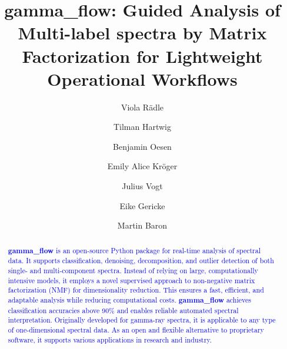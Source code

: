 \documentclass[preprint,12pt, a4paper]{elsarticle}
\begin{document}
\renewcommand{\labelenumii}{\arabic{enumi}.\arabic{enumii}}

\begin{frontmatter}



\title{gamma\_flow: \textbf{G}uided \textbf{A}nalysis of \textbf{M}ulti-label spectra by \textbf{Ma}trix \textbf{F}actorization for \textbf{L}ightweight \textbf{O}perational \textbf{W}orkflows}


\author[ki-lab]{Viola Rädle }
\author[ki-lab]{Tilman Hartwig}
\author[ki-lab]{Benjamin Oesen}
\author[bfs]{Emily Alice Kröger}
\author[bfs]{Julius Vogt}
\author[bfs]{Eike Gericke}
\author[bfs]{Martin Baron}

\address[ki-lab]{Application Lab for AI and Big Data, German Environmental Agency, Leipzig, Germany}
\address[bfs]{Federal Office for Radiation Protection, Berlin, Germany}



\begin{abstract}
\textcolor{blue}{
\textbf{gamma\_flow} is an open-source Python package for real-time analysis of spectral data. It supports classification, denoising, decomposition, and outlier detection of both single- and multi-component spectra. Instead of relying on large, computationally intensive models, it employs a novel supervised approach to non-negative matrix factorization (NMF) for dimensionality reduction. This ensures a fast, efficient, and adaptable analysis while reducing computational costs. \textbf{gamma\_flow} achieves classification accuracies above 90\% and enables reliable automated spectral interpretation. Originally developed for gamma-ray spectra, it is applicable to any type of one-dimensional spectral data. As an open and flexible alternative to proprietary software, it supports various applications in research and industry.} 
\end{abstract}


\end{frontmatter}
\end{document}
